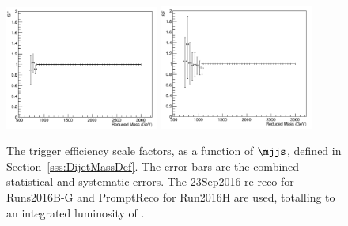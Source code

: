 \begin{figure}[h]
  \begin{center}  
    \includegraphics[width=0.45\textwidth]{F5/SFdEta0v2.pdf} 
    \includegraphics[width=0.45\textwidth]{F5/SFdEta1v2.pdf} 
  \end{center}
  \caption{The trigger efficiency scale factors, as a function of $\mjjs$, defined in Section~\ref{sss:DijetMassDef}. The error bars are the combined statistical and systematic errors. The 23Sep2016 re-reco for Runs2016B-G and PromptReco for Run2016H are used, totalling to an integrated luminosity of \intLumi.}
  \label{fig:trigSF}
  \end{figure} 




